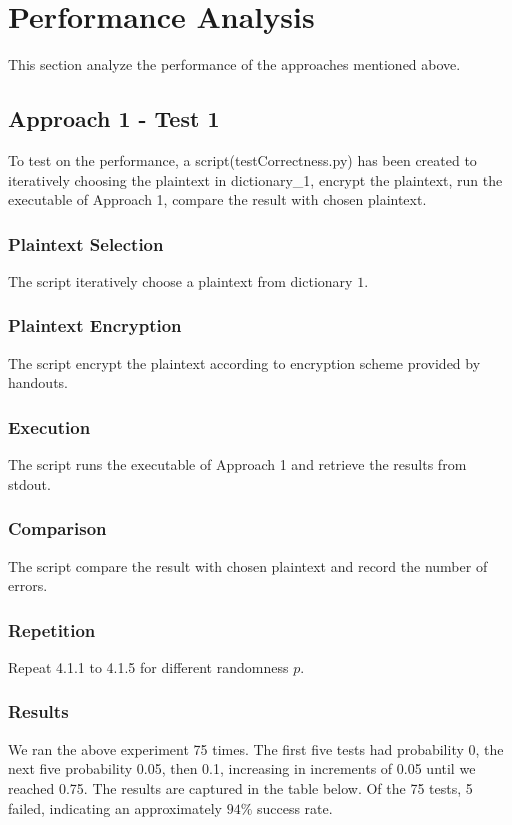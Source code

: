 \documentclass[12pt]{article}
\begin{document}
\section{Performance Analysis}
This section analyze the performance of the approaches mentioned above.
\subsection{Approach 1 - Test 1}
To test on the performance, a script(testCorrectness.py) has been created to iteratively choosing the plaintext in dictionary\_1, encrypt the plaintext, run the executable of Approach 1, compare the result with chosen plaintext.
\subsubsection{Plaintext Selection}
The script iteratively choose a plaintext from dictionary $1$.
\subsubsection{Plaintext Encryption}
The script encrypt the plaintext according to encryption scheme provided by handouts.
\subsubsection{Execution}
The script runs the executable of Approach 1 and retrieve the results from stdout.
\subsubsection{Comparison}
The script compare the result with chosen plaintext and record the number of errors.
\subsubsection{Repetition}
Repeat 4.1.1 to 4.1.5 for different randomness $p$. \\
\subsubsection{Results}
We ran the above experiment 75 times. The first five tests had probability 0, the next five probability 0.05, then 0.1, increasing in increments of 0.05 until we reached 0.75. The results are captured in the table below. Of the 75 tests, 5 failed, indicating an approximately $94\%$ success rate.
\end{document}

